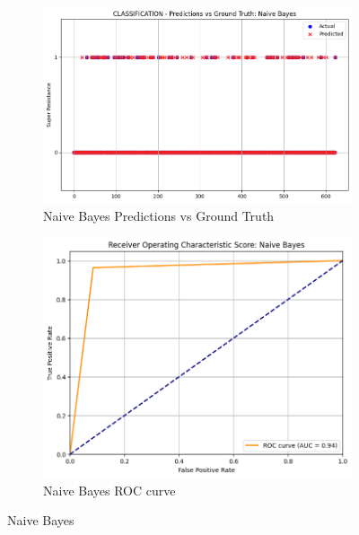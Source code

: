 \documentclass[manuscript,screen,review, nonacm]{acmart}
\begin{document}
  \begin{figure}[H]
      \centering
      \begin{subfigure}{0.45\textwidth}
          \includegraphics[width=\linewidth]{figs/bayes1.png}
          \caption{Naive Bayes Predictions vs Ground Truth}

      \end{subfigure}
      \hfill
      \begin{subfigure}{0.45\textwidth}
          \includegraphics[width=\linewidth]{figs/bayes2.png}
          \caption{Naive Bayes ROC curve}

      \end{subfigure}
      \caption{Naive Bayes}

  \end{figure}
\end{document}
